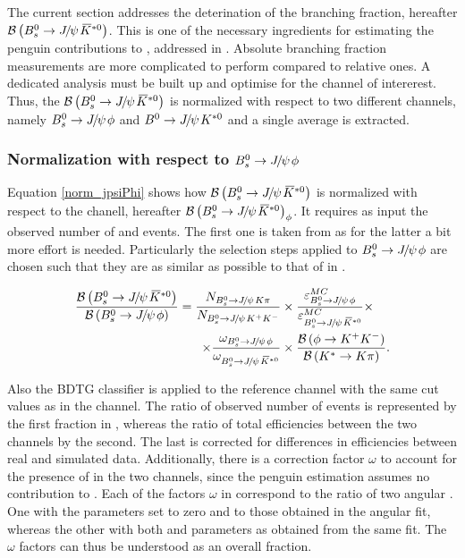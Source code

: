
The current section addresses the deterination of the \BsJpsiKst branching fraction, hereafter $\BRof\BsJpsiKst$.
This is one of the necessary ingredients for estimating the penguin contributions to \phis, addressed in .
Absolute branching fraction measurements are more complicated to perform compared to relative ones. A dedicated analysis
must be built up and optimise for the channel of intererest. Thus, the $\BRof\BsJpsiKst$ is normalized with respect
to two different channels, namely $\BsJpsiPhi$ and $\BdJpsiKst$ and a single average is extracted.

\subsubsection{Normalization with respect to $\BsJpsiPhi$}
Equation \ref{norm_jpsiPhi} shows how $\BRof\BsJpsiKst$ is normalized with respect to the \BsJpsiPhi chanell, hereafter $\BRof{\BsJpsiKst}_\phi$.
It requires as input the observed number of \BsJpsiKst and \BsJpsiPhi events. The first one is taken from  as for
the latter a bit more effort is needed. Particularly the selection steps applied to $\BsJpsiPhi$
are chosen such that they are as similar as possible to that of \BsJpsiKst in .

\begin{align}
  \centering
\frac{\BRof\BsJpsiKst}{\BRof\BsJpsiPhi} = \frac{N_{\BsJpsiKpi}}{N_{\BsJpsiKK}}
                                  &\times \frac{\varepsilon_{\BsJpsiPhi}^{MC}}{\varepsilon_{\BsJpsiKst}^{MC}}
                                   \times \nonumber \\
                                  \times \frac{\omega_{\BsJpsiPhi}}{\omega_{\BsJpsiKst}}
                                  & \times \frac{\BRof{\phi\to\kaon^+\kaon^-}}{\BRof{\Kstar\to\kaon\pion}}.
\label{norm_jpsiPhi}
\end{align}

\noindent Also the BDTG classifier is applied to the reference channel
with the same cut values as in the \BsJpsiKst channel. The ratio of observed number of events is represented by the first fraction in ,
whereas the ratio of total efficiencies between the two channels by the second. The last is corrected for differences in efficiencies between real and
simulated data. Additionally, there is a correction factor $\omega$ to account for the presence of \swave in the two
channels, since the penguin estimation assumes no \swave contribution to \BsJpsiKst. Each of the factors $\omega$ in
 correspond to the ratio of two angular \pdfs. One with the \swave parameters set to zero and
\pwave to those obtained in the angular fit,  whereas the other with both \pwave and \swave parameters as obtained
from the same fit. The $\omega$ factors can thus be understood as an overall \swave fraction.

